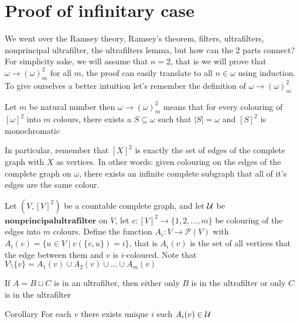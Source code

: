 	\section[Proof of infinitary case]{Proof of infinitary case}
	\begin{frame}
		We went over the Ramsey theory, Ramsey's theorem, filters, ultrafilters, nonprincipal ultrafilter, the ultrafilters lemma, but how can the 2 parts connect?\pause\newline
		For simplicity sake, we will assume that $n=2$, that is we will prove that $\omega\to(\omega)^2_m$ for all $m$\pause, the proof can easily translate to all $n\in\omega$ using induction.\pause\newline
		To give ourselves a better intuition let's remember the definition of $\omega\to(\omega)^2_m$
	\end{frame}
	\begin{frame}
		\begin{definition}
			Let $m$ be natural number then $\omega\to(\omega)^2_m$ means that for every colouring of $[\omega]^2$ into $m$ colours, there exists a $S\subseteq \omega$ such that $|S|=\omega$ and $[S]^2$ is monochromatic 
		\end{definition}\pause
		In particular, remember that $[X]^2$ is exactly the set of edges of the complete graph with $X$ as vertices.\pause\newline
		In other words: given colouring on the edges of the complete graph on $\omega$, there exists an infinite complete subgraph that all of it's edges are the same colour.
	\end{frame}
	\begin{frame}
		Let $(V,[V]^2)$ be a countable complete graph, and let $\mathcal{U}$ be $\mathbf{nonprincipal ultrafilter}$ on $V$, let $c:[V]^2\to\{1,2,...,m\}$ be colouring of the edges into $m$ colours.\pause\newline
		Define the function $A_i:V\to\mathcal{P}(V)$ with $A_i(v)=\{u\in V\mid c(\{v,u\})=i\}$\pause, that is $A_i(v)$ is the set of all vertices that the edge between them and $v$ is $i$-coloured.\pause\newline
		Note that $V\setminus\{v\}=A_1(v)\cup A_2(v)\cup...\cup A_m(v)$\pause
		\begin{lemma}
			If $A=B\sqcup C$ is in an ultrafilter, then either only $B$ is in the ultrafilter or only $C$ is in the ultrafilter
		\end{lemma}\pause
		\begin{block}{Corollary}
			For each $v$ there exists unique $i$ such $A_i(v)\in\mathcal{U}$
		\end{block}
	\end{frame}
